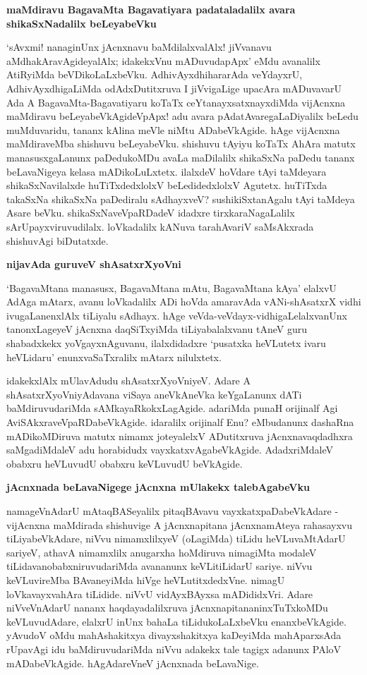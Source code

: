 {\bigskip
\noindent
{\large\bf maMdiravu BagavaMta Bagavatiyara padataladalilx avara shikaSxNadalilx beLeyabeVku}}\label{page67}
\medskip

\noindent
`sAvxmi! nanaginUnx jAcnxnavu baMdilalxvalAlx! jiVvanavu aMdhakAravAgideyalAlx; idakekxVnu mADuvu\-dapApx' eMdu avanalilx AtiRyiMda beVDikoLaLxbeVku. AdhivAyxdhihararAda veYdayxrU, AdhivAyxdhi\-gaLiMda odAdxDu\-titxruva I jiVvigaLige upacAra mADuvavarU Ada A BagavaMta-Bagavatiyaru koTaTx ceYtanayx\-satxnayxdiMda vijAcnxna maMdiravu beLeyabeVkAgideVpApx! adu avara pAdatAvaregaLaDiyalilx beLedu muMdu\-varidu, tananx kAlina meVle niMtu ADabeVkAgide. hAge vijAcnxna maMdiraveMba shishuvu beLeyabeVku. shishuvu tAyiyu koTaTx AhAra matutx manasusxgaLanunx paDedukoMDu avaLa maDilalilx shikaSxNa paDedu tananx beLa\-vaNigeya kelasa mADikoLuLxtetx. ilalxdeV hoVdare tAyi taMdeyara shikaSxNavilalxde huTiTxdedxlolxV beLedi\-dedxlolxV Agutetx. huTiTxda takaSxNa shikaSxNa paDediralu sAdhayxveV? sushikiSxtanAgalu tAyi taMdeya Asare beVku. shikaSxNaveVpaRDadeV idadxre tirxkaraNagaLalilx sArUpayxviruvudilalx. loVkadalilx kANuva tarahAvariV saMsAkxrada shishuvAgi biDutatxde.

{\bigskip
\noindent
{\large\bf nijavAda guruveV shAsatxrXyoVni}}\label{page68}
\medskip

\noindent
`BagavaMtana manasusx, BagavaMtana mAtu, BagavaMtana kAya' elalxvU AdAga mAtarx, avanu loVka\-dalilx ADi hoVda amaravAda vANi-shAsatxrX vidhi ivugaLanenxlAlx tiLi\-yalu sAdhayx. hAge veVda-veVdayx-vidhi\-gaLelalxvanUnx tanonxLageyeV jAcnxna daqSiTx\-yiMda tiLiyabalalxvanu tAneV guru shabadxkekx yoVgayxnAguvanu, ilalxdidadxre `pusatxka heVLutetx ivaru heVLidaru' enunxvaSaTxralilx mAtarx nilulxtetx.

idakekxlAlx mUlavAdudu shAsatxrXyoVniyeV. Adare A shAsatxrXyoVni\-yAdavana viSaya aneVkAneVka keYga\-Lanunx dATi baMdiruvudariMda sAMkayaRkokxLagAgide. adariMda punaH orijinalf Agi AviSAkxra\-veVpaRDabeVkAgide. idaralilx orijinalf Enu? eMbudanunx dashaRna mADikoMDiruva matutx nimamx joteyalelxV ADu\-titxruva jAcnxnavaqdadhxra saMgadiMdaleV adu horabidudx vayxkatxvAgabeVkAgide. Adadx\-riMdaleV obabxru heVLuvudU obabxru keVLuvudU beVkAgide.

{\bigskip
\noindent
{\large\bf jAcnxnada beLavaNigege jAcnxna mUlakekx talebAgabeVku}}\label{page79}
\medskip

\noindent
namageVnAdarU mAtaqBASeyalilx pitaqBAvavu vayxkatxpaDabeVkAdare - vijAcnxna maMdirada shishuvige A jAcnxna\-pitana jAcnxnamAteya rahasayxvu tiLiyabeVkAdare, niVvu nimamxlilxyeV (oLagiMda) tiLidu heVLu\-vaMtA\-darU sariyeV, athavA nimamxlilx anugarxha hoMdiruva nimagiMta modaleV tiLidavanobabxniruvudariMda avananunx keVLitiLidarU sariye. niVvu keVLuvireMba BAvaneyiMda hiVge heVLu\-titxdedxVne. nimagU loVkavayxvahAra tiLidide. niVvU vidAyxBAyxsa mADididxVri. Adare niVveVnAdarU nananx haqdaya\-dalilxruva jAcnxnapitananinxTuTxkoMDu keVLuvudAdare, elalxrU inUnx bahaLa tiLidukoLaLxbeVku enanxbeVkA\-gide. yAvudoV oMdu mahAshakitxya divayxshakitxya kaDeyiMda mahAparxsAda rUpavAgi idu baMdiru\-vudariMda niVvu adakekx tale tagigx adanunx PAloV mADabeVkAgide. hAgAdareVneV jAcnxnada beLavaNige.


